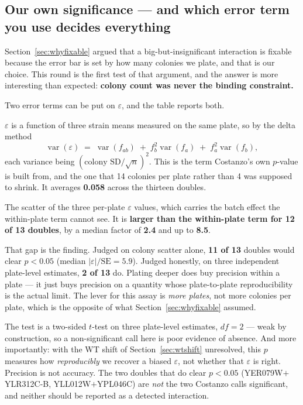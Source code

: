 \subsection{Our own significance --- and which error term you use decides everything}

Section~\ref{sec:whyfixable} argued that a big-but-insignificant interaction is fixable
because the error bar is set by how many colonies we plate, and that is our choice. This
round is the first test of that argument, and the answer is more interesting than expected:
\textbf{colony count was never the binding constraint.}

Two error terms can be put on $\varepsilon$, and the table reports both.

 $\varepsilon$ is a function of three strain means measured on the
same plate, so by the delta method
\begin{equation}
  \operatorname{var}(\varepsilon) \;=\;
  \operatorname{var}(f_{ab}) \;+\; f_b^{2}\operatorname{var}(f_a)
  \;+\; f_a^{2}\operatorname{var}(f_b),
\end{equation}
each variance being $(\text{colony SD}/\sqrt{n})^{2}$. This is the term Costanzo's own
$p$-value is built from, and the one that 14 colonies per plate rather than 4 was supposed to
shrink. It averages \textbf{0.058} across the thirteen doubles.

 The scatter of the three per-plate $\varepsilon$ values, which carries
the batch effect the within-plate term cannot see. It is \textbf{larger than the within-plate
term for 12 of 13 doubles}, by a median factor of \textbf{2.4} and up to \textbf{8.5}.

That gap is the finding. Judged on colony scatter alone, \textbf{11 of 13} doubles would
clear $p<0.05$ (median $|\varepsilon|/\mathrm{SE} = 5.9$). Judged honestly, on three
independent plate-level estimates, \textbf{2 of 13} do. Plating deeper does buy precision
within a plate --- it just buys precision on a quantity whose plate-to-plate reproducibility
is the actual limit. The lever for this assay is \emph{more plates}, not more colonies per
plate, which is the opposite of what Section~\ref{sec:whyfixable} assumed.

 The test is a
two-sided $t$-test on three plate-level estimates, $df=2$ --- weak by construction, so a
non-significant call here is poor evidence of absence. And more importantly: with the WT
shift of Section~\ref{sec:wtshift} unresolved, this $p$ measures how \emph{reproducibly} we
recover a biased $\varepsilon$, not whether that $\varepsilon$ is right. Precision is not
accuracy. The two doubles that do clear $p<0.05$ (YER079W$+$YLR312C-B, YLL012W$+$YPL046C) are
\emph{not} the two Costanzo calls significant, and neither should be reported as a detected
interaction.

